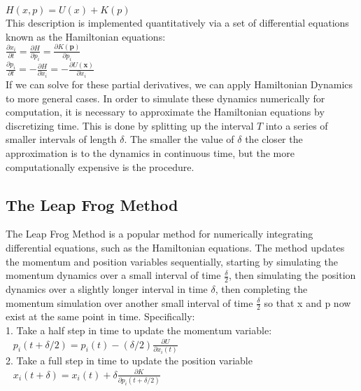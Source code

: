 \documentclass{article}
\begin{document}
$H(x,p) = U(x) + K(p)$
\\

This description is implemented quantitatively via a set of differential equations known as the Hamiltonian equations:
\\

$\frac{\partial x_i}{\partial t} = \frac{\partial H}{\partial p_i} = \frac{\partial K(\mathbf{p})}{\partial p_i}$\\
$\frac{\partial p_i}{\partial t} = -\frac{\partial H}{\partial x_i} = -\frac{\partial U(\mathbf{x})}{\partial x_i}$
\\

If we can solve for these partial derivatives, we can apply Hamiltonian Dynamics to more general cases. In order to simulate these dynamics numerically for computation, it is necessary to approximate the Hamiltonian equations by discretizing time. This is done by splitting up the interval $T$ into a series of smaller intervals of length $\delta$. The smaller the value of $\delta$ the closer the approximation is to the dynamics in continuous time, but the more computationally expensive is the procedure.

\subsection{The Leap Frog Method}

The Leap Frog Method is a popular method for numerically integrating differential equations, such as the Hamiltonian equations. The method updates the momentum and position variables sequentially, starting by simulating the momentum dynamics over a small interval of time $\frac{\delta}{2}$, then simulating the position dynamics over a slightly longer interval in time $\delta$, then completing the momentum simulation over another small interval of time $\frac{\delta}{2}$ so that x and p now exist at the same point in time. Specifically:\\

1. Take a half step in time to update the momentum variable: \\

$~~$ $p_i(t + \delta/2) = p_i(t) - (\delta /2)\frac{\partial U}{\partial x_i(t)}$ \\

2. Take a full step in time to update the position variable \\

$~~$ $x_i(t + \delta) = x_i(t) + \delta \frac{\partial K}{\partial p_i(t + \delta/2)}$ \\
\end{document}
